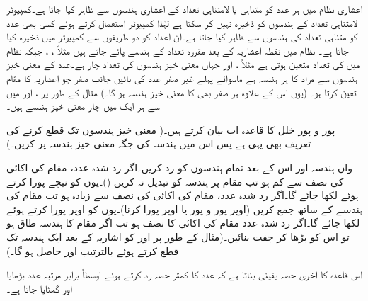 اعشاری نظام میں ہر عدد کو متناہی یا لامتناہی تعداد کے اعشاری ہندسوں سے ظاہر کیا جاتا ہے۔کمپیوٹر لامتناہی تعداد کے ہندسوں کو ذخیرہ نہیں کر سکتا ہے لہٰذا کمپیوٹر استعمال کرتے ہوئے کسی بھی عدد کو متناہی تعداد کی ہندسوں سے ظاہر کیا جاتا ہے۔ان اعداد کو دو طریقوں سے کمپیوٹر میں  ذخیرہ کیا جاتا ہے۔  نظام میں نقطہ اعشاریہ کے بعد مقررہ تعداد کے ہندسے  پائے جاتے ہیں مثلاً ، ،  جبکہ  نظام میں  کی تعداد متعین ہوتی ہے مثلاً ،  اور  جہاں معنی خیز ہندسوں کی تعداد چار ہے۔عدد  کے معنی خیز ہندسوں سے مراد  کا ہر ہندسہ ہے ماسوائے پہلے غیر صفر عدد کی بائیں جانب صفر جو اعشاریہ کا مقام تعین کرتا ہو۔ (یوں اس کے علاوہ ہر صفر بھی  کا معنی خیز ہندسہ ہو گا۔) مثال کے طور پر ،  اور  میں سے ہر ایک میں چار معنی خیز ہندسے ہیں۔

پور و پور خلل کا قاعدہ اب بیان کرتے ہیں۔( معنی خیز ہندسوں تک قطع کرنے کی تعریف بھی یہی ہے پس اس میں ہندسہ کی جگہ معنی خیز ہندسہ پر کریں۔)

 واں ہندسہ اور اس کے بعد تمام ہندسوں کو رد کریں۔اگر رد شدہ عدد، مقام  کی اکائی کی نصف سے کم ہو تب مقام  پر ہندسہ کو تبدیل نہ کریں ()۔یوں  کو نیچے پورا کرتے ہوئے  لکھا جائے گا۔اگر رد شدہ عدد، مقام  کی اکائی کی نصف سے زیادہ ہو تب مقام  کی ہندسے کے ساتھ  جمع کریں (اوپر پور و پور یا اوپر پورا کرنا)۔یوں  کو اوپر پورا کرتے ہوئے  لکھا جائے گا۔اگر رد شدہ عدد مقام  کی اکائی کا نصف ہو تب اگر مقام  کا ہندسہ طاق ہو تو اس کو بڑھا کر جفت بنائیں۔(مثال کے طور پر  اور  کو اشاریہ کے بعد ایک ہندسہ تک قطع کرتے ہوئے بالترتیب  اور  حاصل ہو گا۔)

اس قاعدہ کا آخری حصہ یقینی بناتا ہے کہ  عدد کا کمتر حصہ رد کرتے ہوئے اوسطاً برابر مرتبہ عدد بڑھایا اور گھٹایا جاتا ہے۔ 

